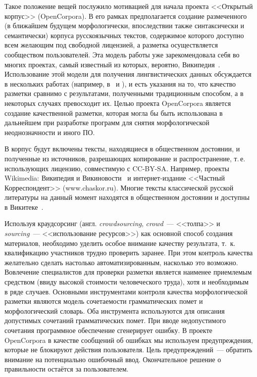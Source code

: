 \documentclass[a4paper]{article}
\begin{document}
Такое положение вещей послужило мотивацией для начала проекта <<Открытый корпус>> (OpenCorpora). В его рамках предполагается создание размеченного (в ближайшем будущем морфологически, впоследствии также синтаксически и семантически) корпуса русскоязычных текстов, содержимое которого доступно всем желающим под свободной лицензией, а разметка осуществляется сообществом пользователей. Эта модель работы уже зарекомендовала себя во многих проектах, самый известный из которых, вероятно, Википедия~\cite{ruwiki}. Использование этой модели для получения лингвистических данных обсуждается в нескольких работах (например, в~\cite{munro10} и \cite{wang10}), и есть указания на то, что качество разметки сравнимо с результатами, полученными традиционным способом, а в некоторых случаях превосходит их. Целью проекта OpenCorpora является создание качественной разметки, которая могла бы быть использована в дальнейшем при разработке программ для снятия морфологической неоднозначности и иного ПО.

В корпус будут включены тексты, находящиеся в общественном достоянии, и полученные из источников, разрешающих копирование и распространение, т.\,е. использующих лицензию, совместимую с CC-BY-SA. Например, проекты Wikimedia: Википедия и Викиновости~\cite{ruwikinews} и интернет-издание <<Частный Корреспондент>> (www.chaskor.ru). Многие тексты классической русской литературы на данный момент находятся в общественном достоянии и доступны в Викитеке~\cite{ruwikisource}.

Используя краудсорсинг (англ. \textit{crowdsourcing}, \textit{crowd}~--- <<толпа>> и \textit{sourcing}~--- <<использование ресурсов>>) как основной способ создания материалов, необходимо уделить особое внимание качеству результата, т.~к. квалификацию участников трудно проверить заранее. При этом контроль качества желательно сделать настолько автоматизированным, насколько это возможно. Вовлечение специалистов для проверки разметки является наименее приемлемым средством (ввиду высокой стоимости человеческого труда), хотя и необходимым в ряде случаев. Основными инструментами контроля качества морфологической разметки являются модель сочетаемости грамматических помет и морфологический словарь. Оба инструмента используются для описания допустимых сочетаний грамматических помет. При вводе недопустимого сочетания программное обеспечение сгенерирует ошибку. В проекте OpenCorpora в качестве сообщений об ошибках мы используем предупреждения, которые не блокируют действия пользователя. Цель предупреждений~--- обратить внимание на потенциально ошибочный ввод. Окончательное решение о правильности остаётся за пользователем.
\end{document}
